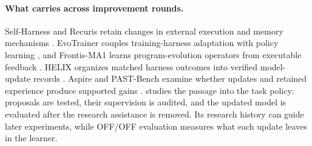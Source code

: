 \paragraph{What carries across improvement rounds.}
Self-Harness and Recuris retain changes in external execution and memory
mechanisms \citep{zhang2026selfharness,yu2026recuris}. EvoTrainer couples
training-harness adaptation with policy learning \citep{chen2026evotrainer},
and Frontis-MA1 learns program-evolution operators from executable feedback
\citep{yang2026frontis}. HELIX organizes matched harness outcomes into
verified model-update records \citep{fan2026helix}. Aspire and PAST-Bench
examine whether updates and retained experience produce supported gains
\citep{wu2026aspire,xue2026past}. \method{} studies the passage into the task
policy: proposals are tested, their supervision is audited, and the updated
model is evaluated after the research assistance is removed. Its research
history can guide later experiments, while OFF/OFF evaluation measures
what each update leaves in the learner.
